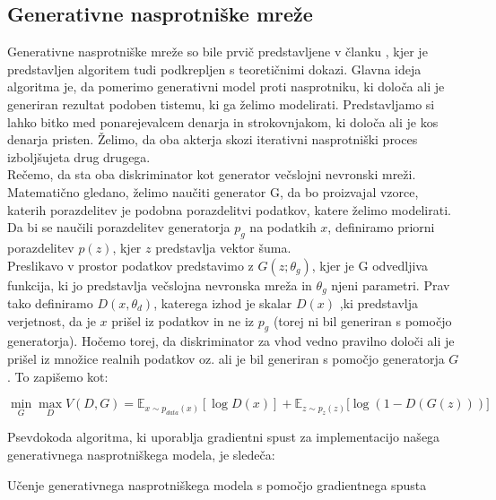 \documentclass[12pt,a4paper,twoside]{article}
\theoremstyle{definition} %
\theoremstyle{plain} %
\numberwithin{equation}{section}  %
\begin{document}
\subsection{Generativne nasprotniške mreže}
Generativne nasprotniške mreže so bile prvič predstavljene v članku  \cite{gangoodfellow}, kjer je predstavljen algoritem tudi podkrepljen s teoretičnimi
dokazi. Glavna ideja algoritma je, da pomerimo generativni model proti nasprotniku, ki določa ali je generiran rezultat podoben tistemu, ki ga želimo modelirati. 
Predstavljamo si lahko bitko med ponarejevalcem denarja in strokovnjakom, ki določa ali je kos denarja pristen. Želimo, da oba akterja skozi iterativni nasprotniški proces izboljšujeta drug drugega. \\
Rečemo, da sta oba  diskriminator kot generator večslojni nevronski mreži. Matematično gledano, želimo naučiti generator G, da bo proizvajal vzorce, katerih porazdelitev je podobna porazdelitvi podatkov, katere želimo modelirati. Da bi se naučili porazdelitev generatorja $p_g$ na podatkih $x$, definiramo priorni porazdelitev $p(z)$, kjer $z$ predstavlja vektor šuma.\\ Preslikavo v prostor podatkov predstavimo z $G(z;\theta_g)$, kjer je G odvedljiva funkcija, ki jo predstavlja večslojna nevronska mreža in $\theta_g$ njeni parametri.  Prav tako definiramo $D(x,\theta_d)$, katerega izhod je skalar $D(x)$ ,ki predstavlja verjetnost, da je $x$ prišel iz podatkov in ne iz  $p_g$ (torej ni bil generiran s pomočjo generatorja). Hočemo torej, da diskriminator za vhod vedno pravilno določi ali je prišel iz množice realnih podatkov oz. ali je bil generiran s pomočjo generatorja $G$. To zapišemo kot: 

$$ \min_G\max_DV(D,G) = \mathbb{E}_{x \sim p_{data}(x)}[\log{D(x)}] + \mathbb{E}_{z \sim p_z(z)}[\log{(1-D(G(z)))]}$$ 

Psevdokoda algoritma, ki uporablja gradientni spust za implementacijo našega generativnega nasprotniškega modela, je sledeča: 
\begin{algorithm}
\caption{Učenje generativnega nasprotniškega modela s pomočjo gradientnega spusta}\label{euclid}
\begin{algorithmic}[1]
\EndFor
\EndFor
\end{algorithmic}
\end{algorithm}
\end{document}
